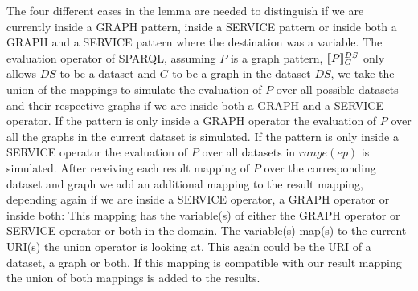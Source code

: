 \begin{proofidea}
	The four different cases in the lemma are needed to distinguish if we are currently inside a GRAPH 
	pattern, inside a SERVICE pattern or inside both a GRAPH and a SERVICE
	pattern where the destination was a variable. The evaluation operator of
	SPARQL, assuming $P$ is a graph pattern, $\llbracket P \rrbracket^{DS}_G$ only allows $DS$ to be a dataset and $G$ to be
	a graph in the dataset $DS$, we take the union of the mappings to simulate the
	evaluation of $P$ over all possible datasets and their respective graphs if we are
	inside both a GRAPH and a SERVICE operator. If the pattern is only inside a GRAPH
	operator the evaluation of $P$ over all the graphs in the current dataset is
	simulated. If the pattern is only inside a SERVICE operator the evaluation
	of $P$ over all datasets in $range(ep)$ is simulated. After receiving each
	result mapping of $P$ over the corresponding dataset and graph we add
	an additional mapping to the result mapping, depending again if we are inside a SERVICE operator, a
	GRAPH operator or inside both: This mapping has the variable(s) of
	either the GRAPH operator or SERVICE operator or both in the domain. The
	variable(s) map(s) to the current URI(s) the union operator is looking at.
	This again could be the URI of a dataset,
	a graph or both. If this mapping is compatible with
	our result mapping the union of both mappings is added to the results.


\end{proofidea}
